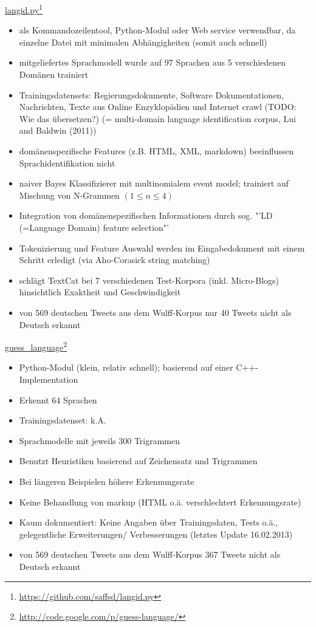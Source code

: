 \documentclass[11pt]{article}
\begin{document}
\underline{langid.py}\footnote{\url{https://github.com/saffsd/langid.py}} \newline
\begin{itemize}
\item als Kommandozeilentool, Python-Modul oder Web service verwendbar, da einzelne Datei mit  minimalen Abhängigkeiten (somit auch schnell)
\item mitgeliefertes Sprachmodell wurde auf 97 Sprachen aus 5 verschiedenen Domänen trainiert
\item Trainingsdatensets: Regierungsdokumente, Software Dokumentationen, Nachrichten,  Texte aus Online Enzyklopädien und Internet crawl (TODO: Wie das übersetzen?) (= multi-domain language identification corpus, Lui and Baldwin (2011))
\item domänenspezifische Features (z.B. HTML, XML, markdown) beeinflussen Sprachidentifikation nicht
\item  naiver Bayes Klassifizierer mit multinomialem event model; trainiert auf Mischung von N-Grammen $(1\leq n \leq4)$
\item Integration von domänenspezifischen Informationen durch sog. "'LD (=Language Domain) feature selection"'
\item Tokenizierung und Feature Auswahl werden im Eingabedokument mit einem Schritt erledigt (via Aho-Corasick string matching)
\item schlägt TextCat bei 7 verschiedenen Test-Korpora (inkl. Micro-Blogs)  hinsichtlich Exaktheit und Geschwindigkeit
\item von 569 deutschen Tweets aus dem Wulff-Korpus nur 40 Tweets nicht als Deutsch erkannt \newline
\end{itemize}



\underline{guess\_language}\footnote{\url{http://code.google.com/p/guess-language/}} \newline
\begin{itemize}
\item Python-Modul (klein, relativ schnell); basierend auf einer C++-Implementation
\item Erkennt 64 Sprachen
\item Trainingsdatenset: k.A.
\item Sprachmodelle mit jeweils 300 Trigrammen
\item Benutzt Heuristiken basierend auf Zeichensatz und Trigrammen
\item Bei längeren Beispielen höhere Erkennungsrate
\item Keine Behandlung von markup (HTML o.ä. verschlechtert Erkennungsrate)
\item Kaum dokumentiert: Keine Angaben über Trainingsdaten, Tests o.ä., gelegentliche Erweiterungen/ Verbesserungen (letztes Update 16.02.2013)
\item von 569 deutschen Tweets aus dem Wulff-Korpus 367 Tweets nicht als Deutsch erkannt
\end{itemize}
\end{document}
